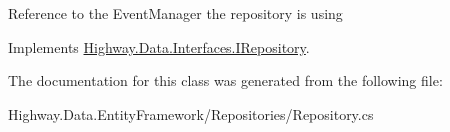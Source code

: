 Reference to the Event\-Manager the repository is using 



Implements \hyperlink{interface_highway_1_1_data_1_1_interfaces_1_1_i_repository_a2f76cda20f7e51ce44c11a077194c747}{Highway.\-Data.\-Interfaces.\-I\-Repository}.



The documentation for this class was generated from the following file\-:\begin{DoxyCompactItemize}
\item 
Highway.\-Data.\-Entity\-Framework/\-Repositories/Repository.\-cs\end{DoxyCompactItemize}
